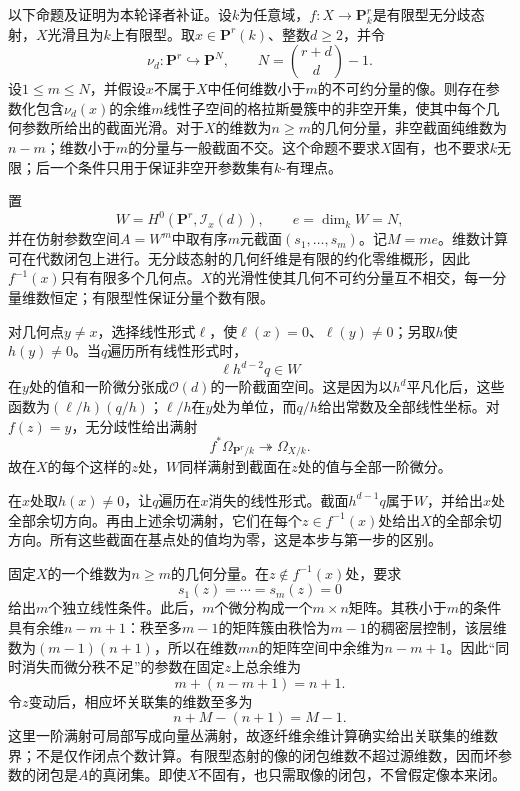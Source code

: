 以下命题及证明为本轮译者补证。设$k$为任意域，$f\colon X\to\mathbf P^r_k$是有限型无分歧态射，$X$光滑且为$k$上有限型。取$x\in\mathbf P^r(k)$、整数$d\geq2$，并令
\[
\nu_d\colon\mathbf P^r\hookrightarrow\mathbf P^N,
\qquad N=\binom{r+d}{d}-1.
\]
设$1\leq m\leq N$，并假设$x$不属于$X$中任何维数小于$m$的不可约分量的像。则存在参数化包含$\nu_d(x)$的余维$m$线性子空间的格拉斯曼簇中的非空开集，使其中每个几何参数所给出的截面光滑。对于$X$的维数为$n\geq m$的几何分量，非空截面纯维数为$n-m$；维数小于$m$的分量与一般截面不交。这个命题不要求$X$固有，也不要求$k$无限；后一个条件只用于保证非空开参数集有$k$-有理点。

\begin{analysisproof}
置
\[
W=H^0(\mathbf P^r,\mathcal I_x(d)),\qquad
e=\dim_kW=N,
\]
并在仿射参数空间$A=W^m$中取有序$m$元截面$(s_1,\ldots,s_m)$。记$M=me$。维数计算可在代数闭包上进行。无分歧态射的几何纤维是有限的约化零维概形，因此$f^{-1}(x)$只有有限多个几何点。$X$的光滑性使其几何不可约分量互不相交，每一分量维数恒定；有限型性保证分量个数有限。

对几何点$y\ne x$，选择线性形式$\ell$，使$\ell(x)=0$、$\ell(y)\ne0$；另取$h$使$h(y)\ne0$。当$q$遍历所有线性形式时，
\[
\ell h^{d-2}q\in W
\]
在$y$处的值和一阶微分张成$\mathcal O(d)$的一阶截面空间。这是因为以$h^d$平凡化后，这些函数为$(\ell/h)(q/h)$；$\ell/h$在$y$处为单位，而$q/h$给出常数及全部线性坐标。对$f(z)=y$，无分歧性给出满射
\[
f^*\Omega_{\mathbf P^r/k}\twoheadrightarrow\Omega_{X/k}.
\]
故在$X$的每个这样的$z$处，$W$同样满射到截面在$z$处的值与全部一阶微分。

在$x$处取$h(x)\ne0$，让$q$遍历在$x$消失的线性形式。截面$h^{d-1}q$属于$W$，并给出$x$处全部余切方向。再由上述余切满射，它们在每个$z\in f^{-1}(x)$处给出$X$的全部余切方向。所有这些截面在基点处的值均为零，这是本步与第一步的区别。

固定$X$的一个维数为$n\geq m$的几何分量。在$z\notin f^{-1}(x)$处，要求
\[
s_1(z)=\cdots=s_m(z)=0
\]
给出$m$个独立线性条件。此后，$m$个微分构成一个$m\times n$矩阵。其秩小于$m$的条件具有余维$n-m+1$：秩至多$m-1$的矩阵簇由秩恰为$m-1$的稠密层控制，该层维数为$(m-1)(n+1)$，所以在维数$mn$的矩阵空间中余维为$n-m+1$。因此“同时消失而微分秩不足”的参数在固定$z$上总余维为
\[
m+(n-m+1)=n+1.
\]
令$z$变动后，相应坏关联集的维数至多为
\[
n+M-(n+1)=M-1.
\]
这里一阶满射可局部写成向量丛满射，故逐纤维余维计算确实给出关联集的维数界；不是仅作闭点个数计算。有限型态射的像的闭包维数不超过源维数，因而坏参数的闭包是$A$的真闭集。即使$X$不固有，也只需取像的闭包，不曾假定像本来闭。


\end{analysisproof}
